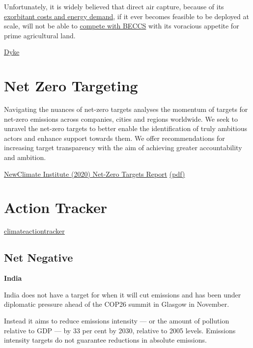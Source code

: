 \documentclass[
]{book}
\begin{document}
Unfortunately, it is widely believed that direct air capture, because of its \href{https://www.wri.org/blog/2021/01/direct-air-capture-definition-cost-considerations}{exorbitant costs and energy demand}, if it ever becomes feasible to be deployed at scale, will not be able to \href{https://www.nature.com/articles/s41558-020-0885-y}{compete with BECCS} with its voracious appetite for prime agricultural land.

\href{https://theconversation.com/climate-scientists-concept-of-net-zero-is-a-dangerous-trap-157368}{Dyke}

\hypertarget{net-zero-targeting}{%
\section{Net Zero Targeting}\label{net-zero-targeting}}

Navigating the nuances of net-zero targets
analyses the momentum of targets for net-zero
emissions across companies, cities and regions
worldwide. We seek to unravel the net-zero
targets to better enable the identification of truly
ambitious actors and enhance support towards
them. We offer recommendations for increasing
target transparency with the aim of achieving
greater accountability and ambition.

\href{https://newclimate.org/2020/10/22/navigating-the-nuances-of-net-zero-targets/}{NewClimate Institute (2020) Net-Zero Targets Report}
\href{pdf/NewClimate_NetZeroReport_October2020.pdf}{(pdf)}

\hypertarget{action-tracker}{%
\section{Action Tracker}\label{action-tracker}}

\href{https://climateactiontracker.org/}{climateactiontracker}

\hypertarget{net-negative-1}{%
\subsection{Net Negative}\label{net-negative-1}}

\textbf{India}

India does not have a target for when it will cut emissions and has been under diplomatic pressure ahead of the COP26 summit in Glasgow in November.

Instead it aims to reduce emissions intensity --- or the amount of pollution relative to GDP --- by 33 per cent by 2030, relative to 2005 levels. Emissions intensity targets do not guarantee reductions in absolute emissions.
\end{document}
